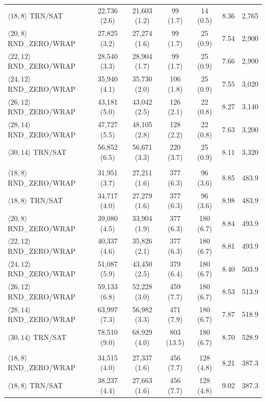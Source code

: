 \begin{table}[p]
\begin{tabular}{lcccccc}
$\langle 18,8\rangle$ TRN/SAT & 22,736 (2.6) & 21,603 (1.2) & 99 (1.7) & 14 (0.5) & 8.36 & 2,765 \\
$\langle 20,8\rangle$ RND\_ZERO/WRAP & 27,825 (3.2) & 27,274 (1.6) & 99 (1.7) & 25 (0.9) & 7.54 & 2,900 \\
$\langle 22,12\rangle$ RND\_ZERO/WRAP & 28,540 (3.3) & 28,904 (1.7) & 99 (1.7) & 25 (0.9) & 7.66 & 2,900 \\
$\langle 24,12\rangle$ RND\_ZERO/WRAP & 35,940 (4.1) & 35,730 (2.0) & 106 (1.8) & 25 (0.9) & 7.55 & 3,020 \\
$\langle 26,12\rangle$ RND\_ZERO/WRAP & 43,181 (5.0) & 43,042 (2.5) & 126 (2.1) & 22 (0.8) & 8.27 & 3,140 \\
$\langle 28,14\rangle$ RND\_ZERO/WRAP & 47,727 (5.5) & 48,105 (2.8) & 128 (2.2) & 22 (0.8) & 7.63 & 3,200 \\
$\langle 30,14\rangle$ TRN/SAT & 56,852 (6.5) & 56,671 (3.3) & 220 (3.7) & 25 (0.9) & 8.11 & 3,320 \\
\addlinespace
\multicolumn{7}{l}{\textbf{TDLA30-75 (limit: 606 cycles)}} \\
$\langle 18,8\rangle$ RND\_ZERO/WRAP & 31,951 (3.7) & 27,211 (1.6) & 377 (6.3) & 96 (3.6) & 8.85 & 483.9 \\
$\langle 18,8\rangle$ TRN/SAT & 34,717 (4.0) & 27,279 (1.6) & 377 (6.3) & 96 (3.6) & 8.98 & 483.9 \\
$\langle 20,8\rangle$ RND\_ZERO/WRAP & 39,080 (4.5) & 33,904 (1.9) & 377 (6.3) & 180 (6.7) & 8.84 & 493.9 \\
$\langle 22,12\rangle$ RND\_ZERO/WRAP & 40,337 (4.6) & 35,826 (2.1) & 377 (6.3) & 180 (6.7) & 8.81 & 493.9 \\
$\langle 24,12\rangle$ RND\_ZERO/WRAP & 51,087 (5.9) & 43,450 (2.5) & 379 (6.4) & 180 (6.7) & 8.40 & 503.9 \\
$\langle 26,12\rangle$ RND\_ZERO/WRAP & 59,133 (6.8) & 52,228 (3.0) & 459 (7.7) & 180 (6.7) & 8.53 & 513.9 \\
$\langle 28,14\rangle$ RND\_ZERO/WRAP & 63,997 (7.3) & 56,982 (3.3) & 471 (7.9) & 180 (6.7) & 7.87 & 518.9 \\
$\langle 30,14\rangle$ TRN/SAT & 78,510 (9.0) & 68,929 (4.0) & 803 (13.5) & 180 (6.7) & 8.70 & 528.9 \\
\addlinespace
\multicolumn{7}{l}{\textbf{TDLC300-100 (limit: 454 cycles)}} \\
$\langle 18,8\rangle$ RND\_ZERO/WRAP & 34,515 (4.0) & 27,337 (1.6) & 456 (7.7) & 128 (4.8) & 8.21 & 387.3 \\
$\langle 18,8\rangle$ TRN/SAT & 38,237 (4.4) & 27,663 (1.6) & 456 (7.7) & 128 (4.8) & 9.02 & 387.3 \\

\end{tabular}
\end{table}
